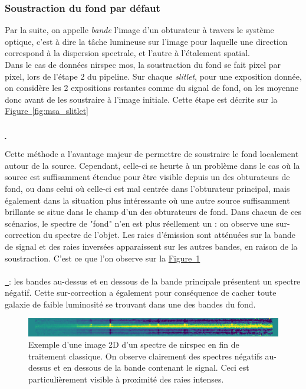 \documentclass[12pt, a4paper]{article}
\newcommand*{\figref}[2][]{%
  \hyperref[{#2}]{%
    Figure~\ref*{#2}%
    \ifx\\#1\\%
    \else
      \,#1%
    \fi
  }%
}
\begin{document}
  \subsubsection{Soustraction du fond par défaut}

  Par la suite, on appelle \textit{bande} l'image d'un obturateur à travers le système optique, c'est à dire la tâche lumineuse sur l'image pour laquelle une direction correspond à la dispersion spectrale, et l'autre à l'étalement spatial.\\

  Dans le cas de données \gls{nirspec} \gls{mos}, la soustraction du fond se fait pixel par pixel, lors de l'étape 2 du pipeline. Sur chaque \textit{slitlet}, pour une exposition donnée, on considère les 2 expositions restantes comme du signal de fond, on les moyenne donc avant de les soustraire à l'image initiale. Cette étape est décrite sur la \figref{fig:msa_slitlet}

  Cette méthode a l'avantage majeur de permettre de soustraire le fond localement autour de la source. Cependant, celle-ci se heurte à un problème dans le cas où la source est suffisamment étendue pour être visible depuis un des obturateurs de fond, ou dans celui où celle-ci est mal centrée dans l'obturateur principal, mais également dans la situation plus intéressante où une autre source suffisamment brillante se situe dans le champ d'un des obturateurs de fond. Dans chacun de ces scénarios, le spectre de "fond" n'en est plus réellement un : on observe une sur-correction du spectre de l'objet. Les raies d'émission sont atténuées sur la bande de signal et des raies inversées apparaissent sur les autres bandes, en raison de la soustraction. C'est ce que l'on observe sur la \figref{fig:negative_trace} : les bandes au-dessus et en dessous de la bande principale présentent un spectre négatif. Cette sur-correction a également pour conséquence de cacher toute galaxie de faible luminosité se trouvant dans une des bandes du fond.\\
  
  \begin{figure}[H]
    \centering
    \includegraphics[scale=1.1]{assets/negative_trace_nirspec.png}
    \caption{Exemple d'une image 2D d'un spectre de \gls{nirspec} en fin de traitement classique. On observe clairement des spectres négatifs au-dessus et en dessous de la bande contenant le signal. Ceci est particulièrement visible à proximité des raies intenses.}
    \label{fig:negative_trace}
  \end{figure}
\end{document}
